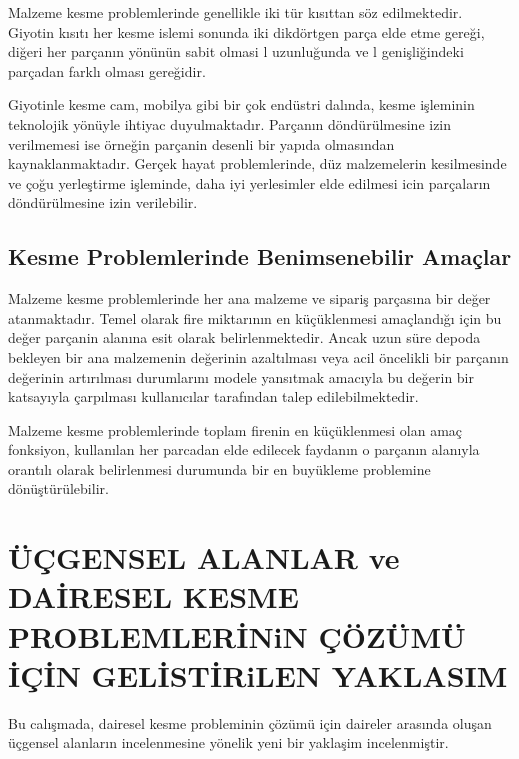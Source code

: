 \documentclass[]{book}
\begin{document}
Malzeme kesme problemlerinde genellikle iki tür kısıttan söz edilmektedir. Giyotin kısıtı her kesme islemi sonunda iki dikdörtgen parça elde etme gereği, diğeri her parçanın yönünün sabit olmasi l uzunluğunda ve l genişliğindeki parçadan farklı
olması gereğidir.

Giyotinle kesme cam, mobilya gibi bir çok endüstri dalında, kesme işleminin teknolojik yönüyle ihtiyac duyulmaktadır. Parçanın döndürülmesine izin verilmemesi ise örneğin parçanin desenli bir yapıda olmasından kaynaklanmaktadır. Gerçek hayat problemlerinde, düz malzemelerin kesilmesinde ve çoğu yerleştirme işleminde, daha iyi yerlesimler elde edilmesi icin parçaların döndürülmesine izin verilebilir.

\hypertarget{kesme-problemlerinde-benimsenebilir-amaclar}{%
\section{Kesme Problemlerinde Benimsenebilir Amaçlar}\label{kesme-problemlerinde-benimsenebilir-amaclar}}

Malzeme kesme problemlerinde her ana malzeme ve sipariş parçasına bir değer atanmaktadır. Temel olarak fire miktarının en küçüklenmesi amaçlandığı için bu değer parçanin alanına esit olarak belirlenmektedir. Ancak uzun süre depoda bekleyen bir ana malzemenin değerinin azaltılması veya acil öncelikli bir parçanın değerinin artırılması durumlarını modele yansıtmak amacıyla bu değerin bir katsayıyla çarpılması kullanıcılar tarafından talep edilebilmektedir.

Malzeme kesme problemlerinde toplam firenin en küçüklenmesi olan amaç fonksiyon, kullanılan her parcadan elde edilecek faydanın o parçanın alanıyla orantılı olarak belirlenmesi durumunda bir en buyükleme problemine dönüştürülebilir.

\citep{xie2015}
\citep{xie2016}
\citep{xie2016}
\citep{xie2017}
\citep{xie2018}
\citep{xie2019}

\hypertarget{ucgensel-alanlar-ve-dairesel-kesme-problemlerinin-cozumu-icin-gelistirilen-yaklasim}{%
\chapter{ÜÇGENSEL ALANLAR ve DAİRESEL KESME PROBLEMLERİNiN ÇÖZÜMÜ İÇİN GELİSTİRiLEN YAKLASIM}\label{ucgensel-alanlar-ve-dairesel-kesme-problemlerinin-cozumu-icin-gelistirilen-yaklasim}}

Bu calışmada, dairesel kesme probleminin çözümü için daireler arasında oluşan üçgensel alanların incelenmesine yönelik yeni bir yaklaşim incelenmiştir.
\end{document}
